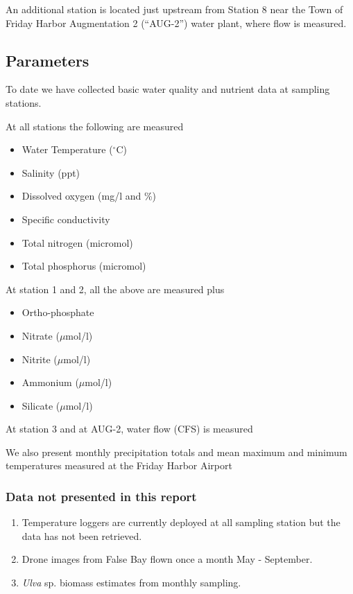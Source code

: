 \documentclass[
]{article}
\providecommand{\tightlist}{%
  \setlength{\itemsep}{0pt}\setlength{\parskip}{0pt}}
\begin{document}
An additional station is located just upstream from Station 8 near the
Town of Friday Harbor Augmentation 2 (``AUG-2'') water plant, where flow
is measured.

\hypertarget{parameters}{%
\subsection{Parameters}\label{parameters}}

To date we have collected basic water quality and nutrient data at
sampling stations.

At all stations the following are measured

\begin{itemize}
\tightlist
\item
  Water Temperature (\(^\circ\)C)
\item
  Salinity (ppt)
\item
  Dissolved oxygen (mg/l and \%)
\item
  Specific conductivity
\item
  Total nitrogen (micromol)
\item
  Total phosphorus (micromol)
\end{itemize}

At station 1 and 2, all the above are measured plus

\begin{itemize}
\tightlist
\item
  Ortho-phosphate
\item
  Nitrate (\(\mu\)mol/l)
\item
  Nitrite (\(\mu\)mol/l)
\item
  Ammonium (\(\mu\)mol/l)
\item
  Silicate (\(\mu\)mol/l)
\end{itemize}

At station 3 and at AUG-2, water flow (CFS) is measured

We also present monthly precipitation totals and mean maximum and
minimum temperatures measured at the Friday Harbor Airport

\hypertarget{data-not-presented-in-this-report}{%
\subsubsection{Data not presented in this
report}\label{data-not-presented-in-this-report}}

\begin{enumerate}
\def\labelenumi{\arabic{enumi}.}
\tightlist
\item
  Temperature loggers are currently deployed at all sampling station but
  the data has not been retrieved.
\item
  Drone images from False Bay flown once a month May - September.
\item
  \emph{Ulva} sp. biomass estimates from monthly sampling.
\end{enumerate}
\end{document}
